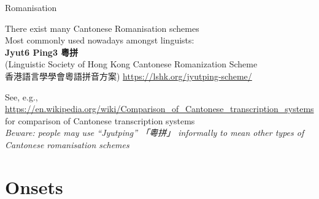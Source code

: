 \documentclass{beamer}
\begin{document}
\begin{frame}[fragile]{Romanisation}

There exist many Cantonese Romanisation schemes \\ 
\bigskip
Most commonly used nowadays amongst linguists:\\
\textbf{Jyut6 Ping3 粵拼}\\
{\scriptsize (Linguistic Society of Hong Kong Cantonese Romanization Scheme \\ 香港語言學學會粵語拼音方案) \quad \url{https://lshk.org/jyutping-scheme/}}

\bigskip
{\footnotesize See, e.g., \\ 
{\url{https://en.wikipedia.org/wiki/Comparison_of_Cantonese_transcription_systems}} \\ for comparison of Cantonese transcription systems}\\
\medskip
\emph{\footnotesize Beware: people may use \enquote{Jyutping} 「粵拼」 informally to mean other types of Cantonese romanisation schemes}

\end{frame}

\section{Onsets}
\end{document}
